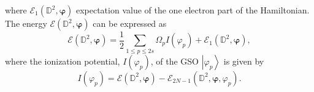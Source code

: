 \documentclass[aps,preprint]{revtex4}%
\begin{document}
where $\mathcal{E}_{1}\left(  \mathbb{D}^{2},\bm{\varphi}\right)  $
expectation value of the one electron part of the Hamiltonian. The energy
$\mathcal{E}\left(  \mathbb{D}^{2},\bm{\varphi}\right)  $ can be expressed as
\begin{equation}
\mathcal{E}\left(  \mathbb{D}^{2},\bm{\varphi}\right)  =\frac{1}{2}\sum_{1\leq
p\leq2s}\Omega_{p}I\left(  \varphi_{p}\right)  +\mathcal{E}_{1}\left(
\mathbb{D}^{2},\bm{\varphi}\right)  , \label{TEexpec}%
\end{equation}
where the ionization potential, $I\left(  \varphi_{p}\right)  $, of the GSO
$\left\vert \varphi_{p}\right\rangle $ is given by
\begin{equation}
I\left(  \varphi_{p}\right)  =\mathcal{E}\left(  \mathbb{D}^{2}%
,\bm{\varphi}\right)  -\mathcal{E}_{2N-1}\left(  \mathbb{D}^{2}%
,\bm{\varphi},\varphi_{p}\right)  .
\end{equation}
\end{document}
